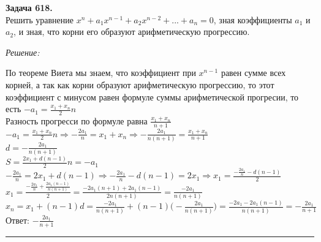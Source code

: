 \documentclass[a4paper, 12pt]{article}
\newenvironment{problem}[2][Задача]
    { \begin{mdframed}[backgroundcolor=gray!10] \textbf{#1 #2.} \\}
    {  \end{mdframed}}
\newenvironment{solution}
    {\textit{Решение: }}
    {\noindent\rule{7in}{1.5pt}}
\begin{document}
\begin{problem}{618}
Решить уравнение $x^n+a_1 x^{n-1}+a_2 x^{n-2}+...+a_n = 0$, зная коэффициенты $a_1$ и $a_2$, и зная, что корни его образуют арифметическую прогрессию.
\end{problem}
\begin{solution}

По теореме Виета мы знаем, что коэффициент при $\displaystyle x^{n-1}$ равен сумме всех корней, а так как корни образуют арифметическую прогрессию, то этот коэффициент с минусом равен формуле суммы арифметической прогресии, то есть $\displaystyle -a_1 = \frac{x_1 + x_n}{2}n$
\\
Разность прогресси по формуле равна $\displaystyle\frac{x_1 + x_n}{n + 1}$
\\
$\displaystyle -a_1 = \frac{x_1 + x_n}{2}n \Rightarrow -\frac{2a_1}{n} = x_1 + x_n \Rightarrow -\frac{2a_1}{n(n + 1)} = \frac{x_1 + x_n}{n + 1}$
\\
$\displaystyle d = -\frac{2a_1}{n(n + 1)}$
\\
$\displaystyle S = \frac{2x_1 + d(n - 1)}{2}n = -a_1$
\\
$\displaystyle - \frac{2a_1}{n} = 2x_1 + d(n - 1) \Rightarrow -\frac{2a_1}{n} - d(n - 1) = 2x_1 \Rightarrow x_1 = \frac{-\frac{2a_1}{n} - d(n - 1)}{2}$
\\
$\displaystyle x_1 = \frac{-\frac{2a_1}{n} + \frac{2a_1(n - 1)}{n(n + 1)}}{2} = \frac{-2a_1(n + 1) + 2a_1(n - 1)}{2n(n + 1)} = \frac{-2a_1}{n(n + 1)}$
\\
$\displaystyle x_n = x_1 + (n - 1)d = \frac{-2a_1}{n(n + 1)} + (n - 1)\biggl(-\frac{2a_1}{n(n + 1)}\biggr) = \frac{-2a_1 - 2a_1(n - 1)}{n(n + 1)} = -\frac{2a_1}{n + 1}$
\\
Ответ: $\displaystyle -\frac{2a_1}{n + 1}$

\end{solution}
\end{document}
